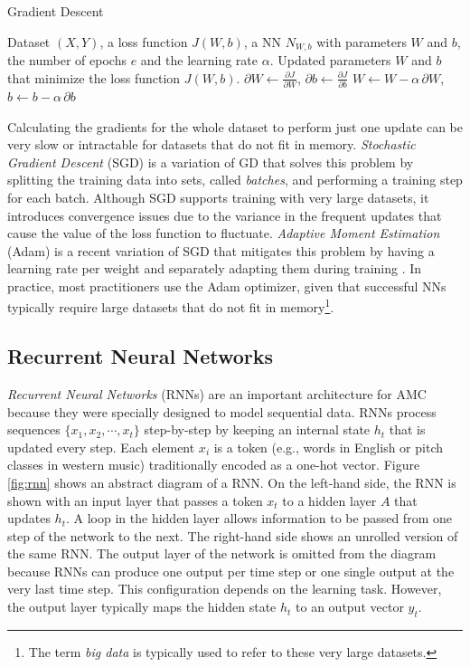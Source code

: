 \begin{algorithm}[t]
\caption{Gradient Descent}
\label{alg:grad_desc}
\begin{algorithmic}[1]
\REQUIRE Dataset $(X, Y)$, a loss function $J(W,b)$, a NN $N_{W,b}$ with
parameters $W$ and $b$, the number of epochs $e$ and the learning rate $\alpha$.
\ENSURE Updated parameters $W$ and $b$ that minimize the loss function $J(W,b)$.
       \STATE $\partial W \gets \frac{\partial J}{\partial W}$, $\partial b \gets \frac{\partial J}{\partial b}$ \label{line:grad}
       \STATE $W \gets W - \alpha \, \partial W$, $b \gets b - \alpha \, \partial b$ \label{line:update}
\ENDFOR
\end{algorithmic}
\end{algorithm}

Calculating the gradients for the whole dataset to perform just one update can be very slow or intractable for datasets that do not fit in memory. \textit{Stochastic Gradient Descent} (SGD) is a variation of GD that solves this problem by splitting the training data into sets, called \textit{batches}, and performing a training step for each batch. Although SGD supports training with very large datasets, it introduces convergence issues due to the variance in the frequent updates that cause the value of the loss function to fluctuate. \textit{Adaptive Moment Estimation} (Adam) is a recent variation of SGD that mitigates this problem by having a learning rate per weight and separately adapting them during training \cite{adam14}. In practice, most practitioners use the Adam optimizer, given that successful NNs typically require large datasets that do not fit in memory\footnote{The term \textit{big data} is typically used to refer to these very large datasets.}.

\subsection{Recurrent Neural Networks}
\label{sec:rnns}

\textit{Recurrent Neural Networks} (RNNs) are an important architecture for AMC because they were specially designed to model sequential data. RNNs process sequences $\{x_1, x_2, \cdots, x_t\}$ step-by-step by keeping an internal state $h_t$ that is updated every step. Each element $x_i$ is a token (e.g., words in English or pitch classes in western music) traditionally encoded as a one-hot vector. Figure \ref{fig:rnn} shows an abstract diagram of a RNN. On the left-hand side, the RNN is shown with an input layer that passes a token $x_t$ to a hidden layer $A$ that updates $h_t$. A loop in the hidden layer allows information to be passed from one step of the network to the next. The right-hand side shows an unrolled version of the same RNN. The output layer of the network is omitted from the diagram because RNNs can produce one output per time step or one single output at the very last time step. This configuration depends on the learning task. However, the output layer typically maps the hidden state $h_t$ to an output vector $y_t$.

